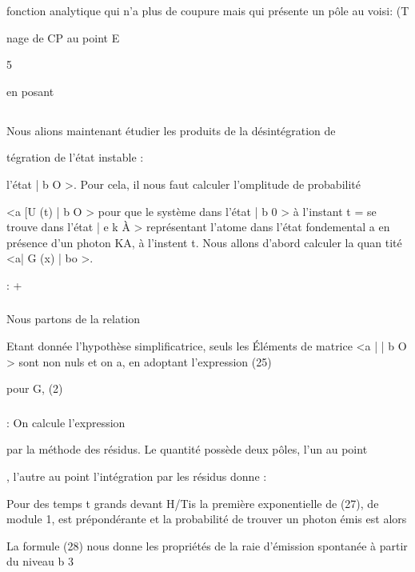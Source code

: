 fonction analytique qui n'a plus de coupure mais qui présente un pôle au voisi: (T

nage de CP au point E

5

en posant 

\subsection{}%

Nous alions maintenant étudier les produits de la désintégration de

tégration de l'état instable :



l'état | b O >. Pour cela, il nous faut calculer l'omplitude de probabilité

<a  [U (t) | b O > pour que le système dans l'état | b 0 > à l'instant t =
se trouve dans l'état | e k À > représentant l'atome dans l'état fondemental a
en présence d'un photon KA, à l'instent t. Nous allons d'abord calculer la quan
tité <a| G (x) | bo >.


: +
\subsubsection{}%

Nous partons de la relation

Etant donnée l'hypothèse simplificatrice, seuls les Éléments de matrice
<a | | b O > sont non nuls et on a, en adoptant l'expression (25)

pour G, (2)



\subsubsection{}%
: On calcule l'expression

par la méthode des résidus.
Le quantité  possède deux pôles, l'un au point

, l'autre au point  l'intégration par les résidus
donne :

Pour des temps t grands devant H/Tis la première exponentielle
de (27), de module 1, est prépondérante et la probabilité de trouver un photon
 émis est alors


La formule (28) nous donne les propriétés de la raie d'émission spontanée à partir du niveau b 3

